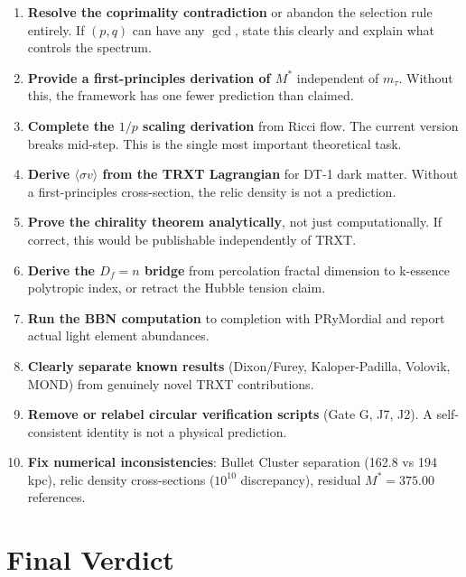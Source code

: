 \documentclass[12pt, a4paper]{article}
\begin{document}
\begin{enumerate}
    \item \textbf{Resolve the coprimality contradiction} or abandon the selection rule entirely. If $(p,q)$ can have any $\gcd$, state this clearly and explain what controls the spectrum.
    
    \item \textbf{Provide a first-principles derivation of $M^*$} independent of $m_\tau$. Without this, the framework has one fewer prediction than claimed.
    
    \item \textbf{Complete the $1/p$ scaling derivation} from Ricci flow. The current version breaks mid-step. This is the single most important theoretical task.
    
    \item \textbf{Derive $\langle\sigma v\rangle$ from the TRXT Lagrangian} for DT-1 dark matter. Without a first-principles cross-section, the relic density is not a prediction.
    
    \item \textbf{Prove the chirality theorem analytically}, not just computationally. If correct, this would be publishable independently of TRXT.
    
    \item \textbf{Derive the $D_f = n$ bridge} from percolation fractal dimension to k-essence polytropic index, or retract the Hubble tension claim.
    
    \item \textbf{Run the BBN computation} to completion with PRyMordial and report actual light element abundances.
    
    \item \textbf{Clearly separate known results} (Dixon/Furey, Kaloper-Padilla, Volovik, MOND) from genuinely novel TRXT contributions.
    
    \item \textbf{Remove or relabel circular verification scripts} (Gate G, J7, J2). A self-consistent identity is not a physical prediction.
    
    \item \textbf{Fix numerical inconsistencies}: Bullet Cluster separation (162.8 vs 194 kpc), relic density cross-sections ($10^{10}$ discrepancy), residual $M^* = 375.00$ references.
\end{enumerate}

\section{Final Verdict}
\end{document}
